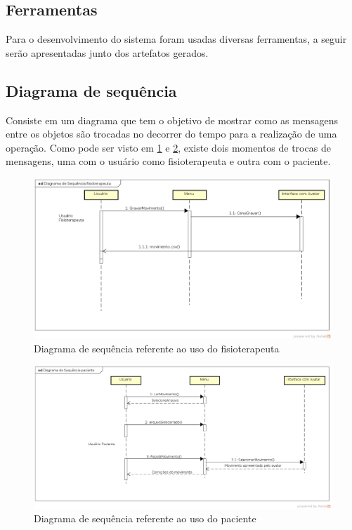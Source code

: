 \subsection{Ferramentas}\label{sub:solFerramentas}
  Para o desenvolvimento do sistema foram usadas diversas ferramentas, a seguir serão apresentadas junto
dos artefatos gerados.
\subsection{Diagrama de sequência}\label{sub:diagramaSequencia}
  Consiste em um diagrama que tem o objetivo de mostrar como as mensagens entre os objetos são trocadas no decorrer do tempo para a realização de uma operação.\cite{diagramaSequencia}
Como pode ser visto em \ref{diagramaFisio} e \ref{diagramaPaciente}, existe dois momentos de trocas de mensagens, uma com o usuário como fisioterapeuta e outra
com o paciente.

\begin{figure}[!h]
\centering
\includegraphics [keepaspectratio=true,scale=0.45]{figuras/diagramaFisio.eps}

\caption{Diagrama de sequência referente ao uso do fisioterapeuta}
\label{diagramaFisio}
\end{figure}

\begin{figure}[!h]
\centering
\includegraphics [keepaspectratio=true,scale=0.45]{figuras/diagramaPaciente.eps}

\caption{Diagrama de sequência referente ao uso do paciente}
\label{diagramaPaciente}
\end{figure}

